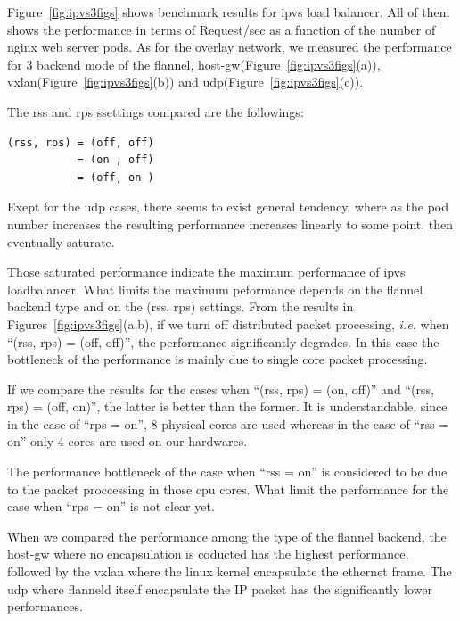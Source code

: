 Figure~\ref{fig:ipvs3figs} shows benchmark results for ipvs load balancer. 
All of them shows the performance in terms of Request/sec as a function of the number of nginx web server pods.
As for the overlay network, we measured the performance for 3 backend mode of the flannel, 
host-gw(Figure~\ref{fig:ipvs3figs}(a)), vxlan(Figure~\ref{fig:ipvs3figs}(b)) and udp(Figure~\ref{fig:ipvs3figs}(c)).

The rss and rps ssettings compared are the followings: 

\begin{center}
\begin{minipage}{0.8\columnwidth}
\begin{verbatim}
(rss, rps) = (off, off)
           = (on , off)
           = (off, on )
\end{verbatim}
\end{minipage}
\end{center}

Exept for the udp cases, there seems to exist general tendency, 
where as the pod number increases the resulting performance increases linearly to some point, 
then eventually saturate.

Those saturated performance indicate the maximum performance of ipvs loadbalancer.
What limits the maximum peformance depends on the flannel backend type and on the (rss, rps) settings.
From the results in Figures~\ref{fig:ipvs3figs}(a,b), if we turn off distributed packet processing,
{\it i.e.} when \enquote{(rss, rps) = (off, off)}, the performance significantly degrades. 
In this case the bottleneck of the performance is mainly due to single core packet processing.

If we compare the results for the cases when \enquote{(rss, rps) = (on, off)} and \enquote{(rss, rps) = (off, on)},
the latter is better than the former.
It is understandable, since in the case of \enquote{rps = on}, 8 physical cores are used whereas 
in the case of \enquote{rss = on} only 4 cores are used on our hardwares.

The performance bottleneck of the case when \enquote{rss = on} is considered 
to be due to the packet proccessing in those cpu cores.
What limit the performance for the case when \enquote{rps = on} is not clear yet.

When we compared the performance among the type of the flannel backend, 
the host-gw where no encapsulation is coducted has the highest performance,
followed by the vxlan where the linux kernel encapsulate the ethernet frame.
The udp where flanneld itself encapsulate the IP packet has the significantly lower performances.

